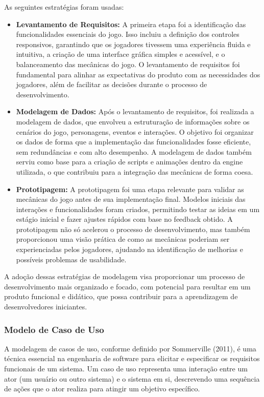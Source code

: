 As seguintes estratégias foram usadas:

\begin{itemize}
    \item \textbf{Levantamento de Requisitos:} A primeira etapa foi a identificação das funcionalidades essenciais do jogo. Isso incluiu a definição dos controles responsivos, garantindo que os jogadores tivessem uma experiência fluida e intuitiva, a criação de uma interface gráfica simples e acessível, e o balanceamento das mecânicas do jogo. O levantamento de requisitos foi fundamental para alinhar as expectativas do produto com as necessidades dos jogadores, além de facilitar as decisões durante o processo de desenvolvimento.

    \item \textbf{Modelagem de Dados:} Após o levantamento de requisitos, foi realizada a modelagem de dados, que envolveu a estruturação de informações sobre os cenários do jogo, personagens, eventos e interações. O objetivo foi organizar os dados de forma que a implementação das funcionalidades fosse eficiente, sem redundâncias e com alto desempenho. A modelagem de dados também serviu como base para a criação de scripts e animações dentro da engine utilizada, o que contribuiu para a integração das mecânicas de forma coesa.

    \item \textbf{Prototipagem:} A prototipagem foi uma etapa relevante para validar as mecânicas do jogo antes de sua implementação final. Modelos iniciais das interações e funcionalidades foram criados, permitindo testar as ideias em um estágio inicial e fazer ajustes rápidos com base no feedback obtido. A prototipagem não só acelerou o processo de desenvolvimento, mas também proporcionou uma visão prática de como as mecânicas poderiam ser experienciadas pelos jogadores, ajudando na identificação de melhorias e possíveis problemas de usabilidade.
\end{itemize}

A adoção dessas estratégias de modelagem visa proporcionar um processo de desenvolvimento mais organizado e focado, com potencial para resultar em um produto funcional e didático, que possa contribuir para a aprendizagem de desenvolvedores iniciantes.

\subsubsection{Modelo de Caso de Uso}

A modelagem de casos de uso, conforme definido por Sommerville (2011), é uma técnica essencial na engenharia de software para elicitar e especificar os requisitos funcionais de um sistema. Um caso de uso representa uma interação entre um ator (um usuário ou outro sistema) e o sistema em si, descrevendo uma sequência de ações que o ator realiza para atingir um objetivo específico.

